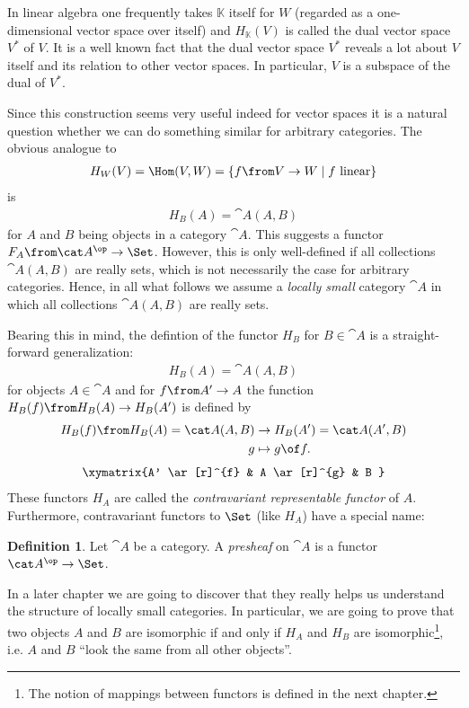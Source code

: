 \documentclass{article}
\theoremstyle{definition}
\newtheorem{definition}{Definition}
\begin{document}
In linear algebra one frequently takes $\mathbb K$ itself for $W$ (regarded as a one-dimensional vector space over itself) and $H_{\mathbb K}(V)$ is called the dual vector space $V^*$ of $V$. It is a well known fact that the dual vector space $V^*$ reveals a lot about $V$ itself and its relation to other vector spaces. In particular, $V$ is a subspace of the dual of $V^*$.

Since this construction seems very useful indeed for vector spaces it is a natural question whether we can do something similar for arbitrary categories.
The obvious analogue to 
\begin{align*}
  H_W(V)=\Hom(V,W)=\{f\from V\to W\mid f \text{ linear}\}
\end{align*}
 is
\begin{align*}
  H_B(A)=\cat A(A,B)
\end{align*}
for $A$ and $B$ being objects in a category $\cat A$. This suggests a functor $F_A\from\cat A^\op\to\Set$. However, this is only well-defined if all collections $\cat A(A,B)$ are really sets, which is not necessarily the case for arbitrary categories. Hence, in all what follows we assume a \emph{locally small} category $\cat A$ in which all collections $\cat A(A,B)$ are really sets. 

Bearing this in mind, the defintion of the functor $H_B$ for $B\in\cat A$ is a straight-forward generalization:
\begin{align*}
  H_B(A)=\cat A(A,B)
\end{align*}
for objects $A\in\cat A$ and for $f\from A'\to A$ the function $H_B(f)\from H_B(A)\to H_B(A')$ is defined by
\begin{align*}
  H_B(f)\from H_B(A)=\cat A(A,B)&\to H_B(A')=\cat A(A',B)\\
  g&\mapsto g\of f.
\end{align*}
\vspace{-0.7cm}
\begin{align*}
  \xymatrix{A' \ar[r]^{f} & A \ar[r]^{g} & B }
\end{align*}
These functors $H_A$ are called the \emph{contravariant representable functor} of $A$. Furthermore, contravariant functors to $\Set$ (like $H_A$) have a special name:
\begin{definition}
  Let $\cat A$ be a category. A \emph{presheaf} on $\cat A$ is a functor $\cat A^\op\to\Set$.
\end{definition}
In a later chapter we are going to discover that they really helps us understand the structure of locally small categories. In particular, we are going to prove that two objects $A$ and $B$ are isomorphic if and only if $H_A$ and $H_B$ are isomorphic\footnote{The notion of mappings between functors is defined in the next chapter.}, i.e. $A$ and $B$ ``look the same from all other objects''.
\end{document}
